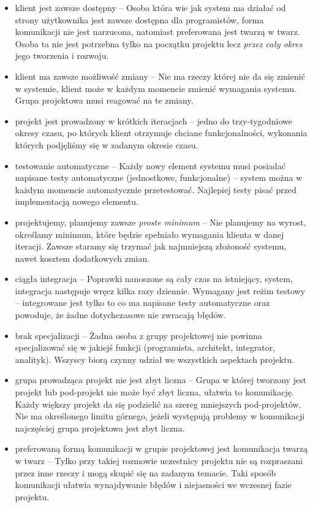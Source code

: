\begin{itemize}
    \item klient jest zawsze dostępny -- Osoba która wie jak system ma działać od strony użytkownika jest zawsze dostępna dla programistów, forma komunikacji nie jest narzucona, natomiast preferowana jest twarzą w twarz. Osoba ta nie jest potrzebna tylko na początku projektu lecz \emph{przez cały okres} jego tworzenia i rozwoju.
    \item klient ma zawsze możliwość zmiany -- Nie ma rzeczy której nie da się zmienić w systemie, klient może w każdym momencie zmienić wymagania systemu. Grupa projektowa musi reagować na te zmiany.
    \item projekt jest prowadzony w krótkich iteracjach -- jedno do trzy-tygodniowe okresy czasu, po których klient otrzymuje chciane funkcjonalności, wykonania których podjęliśmy się w zadanym okresie czasu.
    \item testowanie automatyczne -- Każdy nowy element systemu musi posiadać napisane testy automatyczne (jednostkowe, funkcjonalne) -- system można w każdym momencie automatycznie przetestować. Najlepiej testy pisać przed implementacją nowego elementu.
    \item projektujemy, planujemy zawsze \emph{proste minimum} -- Nie planujemy na wyrost, określamy minimum, które będzie spełniało wymagania klienta w danej iteracji. Zawsze staramy się trzymać jak najmniejszą złożoność systemu, nawet kosztem dodatkowych zmian.
    \item ciągła integracja -- Poprawki nanoszone są cały czas na istniejący, system, integracja następuje wręcz kilka razy dziennie. Wymagany jest reżim testowy -- integrowane jest tylko to co ma napisane testy automatyczne oraz powoduje, że żadne dotychczasowe nie zwracają błędów.
    \item brak specjalizacji -- Żadna osoba z grupy projektowej nie powinna specjalizować się w jakiejś funkcji (programista, architekt, integrator, analityk). Wszyscy biorą czynny udział we wszystkich aspektach projektu.
    \item grupa prowadząca projekt nie jest zbyt liczna -- Grupa w której tworzony jest projekt lub pod-projekt nie może być zbyt liczna, ułatwia to komunikację. Każdy większy projekt da się podzielić na szereg mniejszych pod-projektów. Nie ma określonego limitu górnego, jeżeli występują problemy w komunikacji najczęściej grupa projektowa jest zbyt liczna.
    \item preferowaną formą komunikacji w grupie projektowej jest komunikacja twarzą w twarz -- Tylko przy takiej rozmowie uczestnicy projektu nie są rozpraszani przez inne rzeczy i mogą skupić się na zadanym temacie. Taki sposób komunikacji ułatwia wynajdywanie błędów i niejasności we wczesnej fazie projektu.

\end{itemize}
